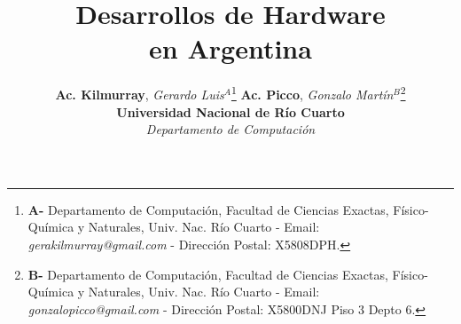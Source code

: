 \documentclass[%
  	final,
%
	notitlepage,
	narroweqnarray,
	inline,
 	twoside,
	]{ieee}
\begin{document}
\onecolumn
\title[Hardware en Argentina]{\sffamily \textbf{Desarrollos de Hardware \\en Argentina}}
\author{\textbf{Ac. Kilmurray}, \textit{Gerardo Luis$^{A}$}\footnote{\textbf{A-} Departamento de Computaci\'on, Facultad de Ciencias Exactas, F\'isico-Qu\'imica y Naturales, Univ. Nac. R\'io Cuarto - Email: \small{\textit{gerakilmurray@gmail.com}} - Direcci\'on Postal: X5808DPH.} \hspace{4cm} \textbf{Ac. Picco}, \textit{Gonzalo Mart\'in$^{B}$}\footnote{\textbf{B-} Departamento de Computaci\'on, Facultad de Ciencias Exactas, F\'isico-Qu\'imica y Naturales, Univ. Nac. R\'io Cuarto - Email: \small{\textit{gonzalopicco@gmail.com}} - Direcci\'on Postal: X5800DNJ Piso 3 Depto 6.}\\[1cm]
	\large \textbf{Universidad Nacional de R\'io Cuarto}\\ \textit{Departamento de Computaci\'on}\\[1cm]
	} 



\maketitle 
\sloppy
\end{document}
